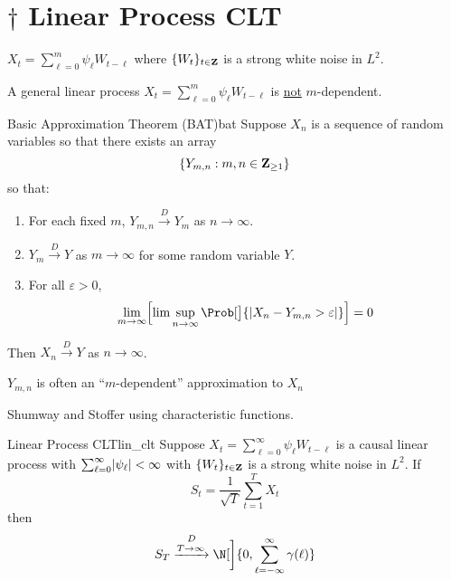 \section{\texorpdfstring{$ \dagger $}{†} Linear Process CLT}
\begin{Example}{}{}
    $ \displaystyle X_t=\sum_{\ell=0}^{m} \psi_\ell W_{t-\ell} $
    where $ \{W_t\}_{t\in\mathbf{Z}} $ is a strong white noise in $ L^2 $.

    A general linear process $ \displaystyle X_t=\sum_{\ell=0}^{m} \psi_\ell W_{t-\ell} $
    is \underline{not} $ m $-dependent.
\end{Example}
\begin{Theorem}{Basic Approximation Theorem (BAT)}{bat}
    Suppose $ X_n $ is a sequence of random variables
    so that there exists an array
    \[ \{Y_{m,n}:m,n\in\mathbf{Z}_{\ge 1}\} \]
    so that:
    \begin{enumerate}[(1)]
        \item For each fixed $ m $, $ Y_{m,n}\stackrel{D}{\to}Y_m $
              as $ n\to\infty $.
        \item $ Y_m\stackrel{D}{\to} Y $ as $ m\to\infty $ for some random variable $ Y $.
        \item For all $ \varepsilon>0 $,
              \[ \lim\limits_{{m} \to {\infty}}
                  \Bigl[\lim\sup\limits_{{n} \to {\infty}}
                  \Prob[\big]{\abs{X_n-Y_{m,n}>\varepsilon}} \Bigr]=0 \]
    \end{enumerate}
    Then $ X_n\stackrel{D}{\to}Y $ as $ n\to\infty $.
\end{Theorem}
\begin{Remark}{}{}
    $ Y_{m,n} $ is often an ``$ m $-dependent'' approximation to $ X_n $
\end{Remark}
\begin{Proof}{}{}
    Shumway and Stoffer using characteristic functions.
\end{Proof}
\begin{Theorem}{Linear Process CLT}{lin_clt}
    Suppose $ X_t=\sum_{\ell=0}^{\infty} \psi_\ell W_{t-\ell} $ is a causal
    linear process with $ \sum_{\ell=0}^{\infty} \lvert\psi_\ell\rvert<\infty $
    with $ \{W_t\}_{t\in\mathbf{Z}} $ is a strong white noise in
    $ L^2 $. If
    \[ S_t=\frac{1}{\sqrt{T}} \sum_{t=1}^{T} X_t \]
    then
    \[ S_T\stackrel{D}{\xrightarrow{T\to\infty}}\N[\bigg]{0,\sum_{\ell=-\infty}^{\infty} \gamma(\ell)} \]
\end{Theorem}
